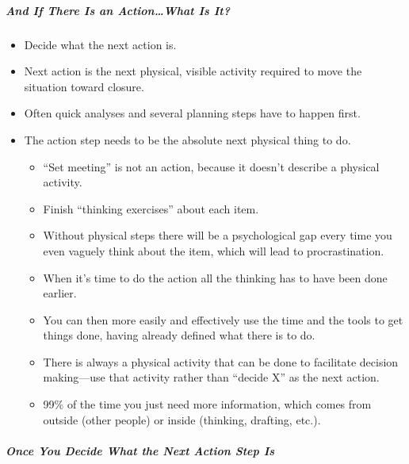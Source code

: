 \documentclass{article}
\begin{document}
\subparagraph{And If There Is an Action\ldots What Is It?}

\begin{itemize}
  \item Decide what the next action is.
  \item Next action is the next physical, visible activity required to move the situation toward closure.
  \item Often quick analyses and several planning steps have to happen first.
  \item The action step needs to be the absolute next physical thing to do.
  \begin{itemize}
    \item ``Set meeting'' is not an action, because it doesn't describe a physical activity.
    \item Finish ``thinking exercises'' about each item.
    \item Without physical steps there will be a psychological gap every time you even vaguely think about the item, which will lead to procrastination.
    \item When it's time to do the action all the thinking has to have been done earlier. \item You can then more easily and effectively use the time and the tools to get things done, having already defined what there is to do.
    \item There is always a physical activity that can be done to facilitate decision making---use that activity rather than ``decide X'' as the next action.
    \item 99\% of the time you just need more information, which comes from outside (other people) or inside (thinking, drafting, etc.).
  \end{itemize}
\end{itemize}

\subparagraph{Once You Decide What the Next Action Step Is}
\end{document}
